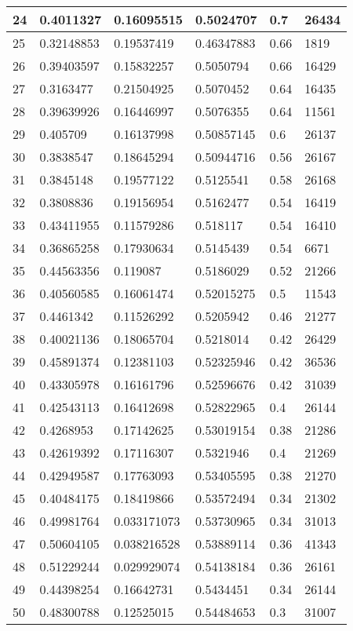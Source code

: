 \begin{longtable}{|l|l|l|l|l|l|}
24 & 0.4011327 & 0.16095515 & 0.5024707 & 0.7 & 26434 \\ \hline 
25 & 0.32148853 & 0.19537419 & 0.46347883 & 0.66 & 1819 \\ \hline 
26 & 0.39403597 & 0.15832257 & 0.5050794 & 0.66 & 16429 \\ \hline 
27 & 0.3163477 & 0.21504925 & 0.5070452 & 0.64 & 16435 \\ \hline 
28 & 0.39639926 & 0.16446997 & 0.5076355 & 0.64 & 11561 \\ \hline 
29 & 0.405709 & 0.16137998 & 0.50857145 & 0.6 & 26137 \\ \hline 
30 & 0.3838547 & 0.18645294 & 0.50944716 & 0.56 & 26167 \\ \hline 
31 & 0.3845148 & 0.19577122 & 0.5125541 & 0.58 & 26168 \\ \hline 
32 & 0.3808836 & 0.19156954 & 0.5162477 & 0.54 & 16419 \\ \hline 
33 & 0.43411955 & 0.11579286 & 0.518117 & 0.54 & 16410 \\ \hline 
34 & 0.36865258 & 0.17930634 & 0.5145439 & 0.54 & 6671 \\ \hline 
35 & 0.44563356 & 0.119087 & 0.5186029 & 0.52 & 21266 \\ \hline 
36 & 0.40560585 & 0.16061474 & 0.52015275 & 0.5 & 11543 \\ \hline 
37 & 0.4461342 & 0.11526292 & 0.5205942 & 0.46 & 21277 \\ \hline 
38 & 0.40021136 & 0.18065704 & 0.5218014 & 0.42 & 26429 \\ \hline 
39 & 0.45891374 & 0.12381103 & 0.52325946 & 0.42 & 36536 \\ \hline 
40 & 0.43305978 & 0.16161796 & 0.52596676 & 0.42 & 31039 \\ \hline 
41 & 0.42543113 & 0.16412698 & 0.52822965 & 0.4 & 26144 \\ \hline 
42 & 0.4268953 & 0.17142625 & 0.53019154 & 0.38 & 21286 \\ \hline 
43 & 0.42619392 & 0.17116307 & 0.5321946 & 0.4 & 21269 \\ \hline 
44 & 0.42949587 & 0.17763093 & 0.53405595 & 0.38 & 21270 \\ \hline 
45 & 0.40484175 & 0.18419866 & 0.53572494 & 0.34 & 21302 \\ \hline 
46 & 0.49981764 & 0.033171073 & 0.53730965 & 0.34 & 31013 \\ \hline 
47 & 0.50604105 & 0.038216528 & 0.53889114 & 0.36 & 41343 \\ \hline 
48 & 0.51229244 & 0.029929074 & 0.54138184 & 0.36 & 26161 \\ \hline 
49 & 0.44398254 & 0.16642731 & 0.5434451 & 0.34 & 26144 \\ \hline 
50 & 0.48300788 & 0.12525015 & 0.54484653 & 0.3 & 31007 \\ \hline 
\end{longtable}